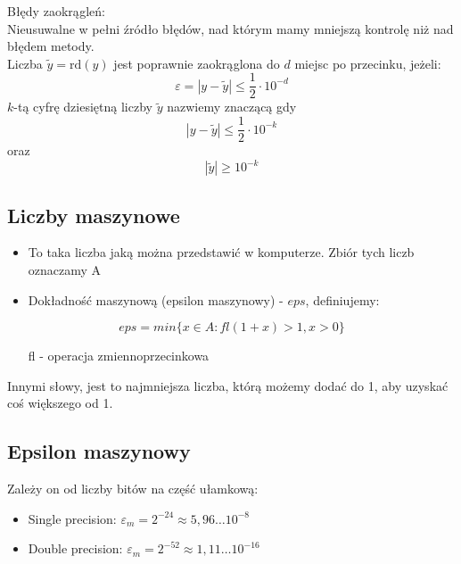 \documentclass[a4paper]{article}
\begin{document}
Błędy zaokrągleń: \\
Nieusuwalne w pełni źródło błędów, nad którym mamy mniejszą kontrolę niż nad błędem metody. \\
Liczba $\tilde{y}=\mathrm{rd}(y)$ jest poprawnie zaokrąglona do $d$ miejsc po przecinku, jeżeli:
\begin{equation*}
    \varepsilon=|y-\tilde{y}|\leq\frac{1}{2} \cdot 10^{-d}
\end{equation*}
$k$-tą cyfrę dziesiętną liczby $\tilde{y}$ nazwiemy znaczącą gdy
\begin{equation*}
    |y-\tilde{y}|\leq\frac{1}{2} \cdot 10^{-k}
\end{equation*}
oraz
\begin{equation*}
    |\tilde{y}|\geq10^{-k}
\end{equation*}

\subsection{Liczby maszynowe}
\begin{itemize}
    \item To taka liczba jaką można przedstawić w komputerze. Zbiór tych liczb oznaczamy A
    \item Dokładność maszynową (epsilon maszynowy) - $eps$, definiujemy:
\end{itemize}

\begin{equation*}
    eps=min\{x\in A:fl(1+x)>1,x>0\}
\end{equation*}

\begin{itemize}
    \item[fl] - operacja zmiennoprzecinkowa
\end{itemize}
Innymi słowy, jest to najmniejsza liczba, którą możemy dodać do 1, aby uzyskać coś większego od 1.


\subsection{Epsilon maszynowy}
Zależy on od liczby bitów na część ułamkową:
\begin{itemize}
    \item Single precision: $\varepsilon_m=2^{-24} \approx 5,96 \ldots 10^{-8}$
    \item Double precision: $\varepsilon_m=2^{-52} \approx 1,11 \ldots 10^{-16}$
\end{itemize}
\end{document}

